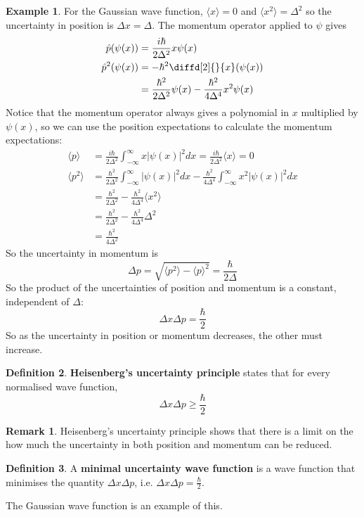 \documentclass[12pt,a4paper]{article}
\theoremstyle{definition}
\newtheorem{definition}{Definition}[subsection]
\newtheorem{example}[definition]{Example}
\newtheorem*{remark}{Remark}
\begin{document}
\begin{example}
	For the Gaussian wave function, $\langle x \rangle = 0$ and $\langle x^2 \rangle = \Delta^2$ so the uncertainty in position is $\Delta x = \Delta$. The momentum operator applied to $\psi$ gives
	\[
		\begin{aligned}
			\hat{p} (\psi(x)) & = \frac{i \hbar}{2 \Delta^2} x \psi(x) \\
			\hat{p}^2 (\psi(x))
				& = -\hbar^2 \diffd[2]{}{x} (\psi(x)) \\
				& = \frac{\hbar^2}{2 \Delta^2} \psi(x) - \frac{\hbar^2}{4 \Delta^4} x^2 \psi(x)
		\end{aligned}
	\]
	Notice that the momentum operator always gives a polynomial in $x$ multiplied by $\psi(x)$, so we can use the position expectations to calculate the momentum expectations:
	\[
		\begin{aligned}
			\langle p \rangle & = \frac{i \hbar}{2 \Delta^2} \int_{-\infty}^{\infty} x |\psi(x)|^2 dx = \frac{i \hbar}{2 \Delta^2} \langle x \rangle = 0 \\
			\langle p^2 \rangle
				& = \frac{\hbar^2}{2 \Delta^2} \int_{-\infty}^{\infty} |\psi(x)|^2 dx - \frac{\hbar^2}{4 \Delta^4} \int_{-\infty}^{\infty} x^2 |\psi(x)|^2 dx \\
				& = \frac{\hbar^2}{2 \Delta^2} - \frac{\hbar^2}{4 \Delta^4} \langle x^2 \rangle \\
				& = \frac{\hbar^2}{2 \Delta^2} - \frac{\hbar^2}{4 \Delta^4} \Delta^2 \\
				& = \frac{\hbar^2}{4 \Delta^2}
		\end{aligned}
	\]
	So the uncertainty in momentum is
	\[
		\Delta p = \sqrt{\langle p^2 \rangle - {\langle p \rangle}^2} = \frac{\hbar}{2 \Delta}
	\]
	So the product of the uncertainties of position and momentum is a constant, independent of $\Delta$:
	\[
		\Delta x \Delta p = \frac{\hbar}{2}
	\]
	So as the uncertainty in position or momentum decreases, the other must increase.
\end{example}

\begin{definition}
	\textbf{Heisenberg's uncertainty principle} states that for every normalised wave function,
	\[
		\Delta x \Delta p \ge \frac{\hbar}{2}
	\]
\end{definition}

\begin{remark}
	Heisenberg's uncertainty principle shows that there is a limit on the how much the uncertainty in both position and momentum can be reduced.
\end{remark}

\begin{definition}
	A \textbf{minimal uncertainty wave function} is a wave function that minimises the quantity $\Delta x \Delta p$, i.e. $\Delta x \Delta p = \frac{\hbar}{2}$.
	
	The Gaussian wave function is an example of this.
\end{definition}
\end{document}
